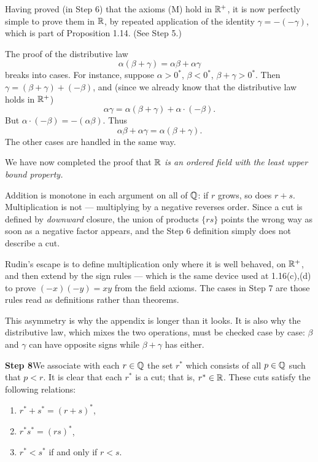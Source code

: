 Having proved (in Step 6) that the axioms (M) hold in $\mathbb{R}^+$, it is now
perfectly simple to prove them in $\mathbb{R}$, by repeated application of the identity
$\gamma = -(-\gamma)$, which is part of Proposition 1.14. (See Step 5.)

The proof of the distributive law
\[ \alpha(\beta+\gamma) = \alpha\beta + \alpha\gamma \]
breaks into cases. For instance, suppose $\alpha > 0^*$, $\beta < 0^*$,
$\beta+\gamma > 0^*$. Then $\gamma = (\beta+\gamma)+(-\beta)$, and (since we
already know that the distributive law holds in $\mathbb{R}^+$)
\[ \alpha\gamma = \alpha(\beta+\gamma) + \alpha\cdot(-\beta). \]
But $\alpha\cdot(-\beta) = -(\alpha\beta)$. Thus
\[ \alpha\beta + \alpha\gamma = \alpha(\beta+\gamma). \]
The other cases are handled in the same way.

We have now completed the proof that \emph{$\mathbb{R}$ is an ordered field with the
least upper bound property.}

\begin{deeper}
Addition is monotone in each argument on all of $\mathbb{Q}$: if $r$ grows, so does
$r+s$. Multiplication is not --- multiplying by a negative reverses order. Since
a cut is defined by \emph{downward} closure, the union of products
$\{rs\}$ points the wrong way as soon as a negative factor appears, and the
Step 6 definition simply does not describe a cut.

Rudin's escape is to define multiplication only where it is well behaved, on
$\mathbb{R}^+$, and then extend by the sign rules --- which is the same device used at
1.16(c),(d) to prove $(-x)(-y) = xy$ from the field axioms. The cases in Step 7
are those rules read as definitions rather than theorems.

This asymmetry is why the appendix is longer than it looks. It is also why the
distributive law, which mixes the two operations, must be checked case by case:
$\beta$ and $\gamma$ can have opposite signs while $\beta+\gamma$ has either.
\end{deeper}

\medskip
\noindent\textbf{Step 8}\quad We associate with each $r \in \mathbb{Q}$ the set $r^*$
which consists of all $p \in \mathbb{Q}$ such that $p < r$. It is clear that each $r^*$
is a cut; that is, $r^* \in \mathbb{R}$. These cuts satisfy the following relations:
\begin{enumerate}[label=(\alph*), leftmargin=2.2em, itemsep=1pt, topsep=3pt]
  \item $r^* + s^* = (r+s)^*$,
  \item $r^*s^* = (rs)^*$,
  \item $r^* < s^*$ if and only if $r < s$.
\end{enumerate}

